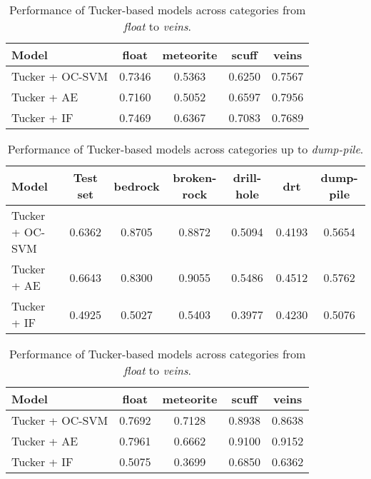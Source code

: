 \documentclass[11pt]{article}
\begin{document}
\begin{table}[h!]
\centering
\begin{tabular}{lcccc}
\hline
\textbf{Model} & \textbf{float} & \textbf{meteorite} & \textbf{scuff} & \textbf{veins} \\
\hline
Tucker + OC-SVM & 0.7346 & 0.5363 & 0.6250 & 0.7567 \\
Tucker + AE     & 0.7160 & 0.5052 & 0.6597 & 0.7956 \\
Tucker + IF     & 0.7469 & 0.6367 & 0.7083 & 0.7689 \\
\hline
\end{tabular}
\caption{Performance of Tucker-based models across categories from \textit{float} to \textit{veins}.}
\label{tab:results_inOrder_tucker_part2}
\end{table}

\begin{table}[h!]
\centering
\begin{tabular}{lcccccc}
\hline
\textbf{Model} & \textbf{Test set} & \textbf{bedrock} & \textbf{broken-rock} & \textbf{drill-hole} & \textbf{drt} & \textbf{dump-pile} \\
\hline
Tucker + OC-SVM & 0.6362 & 0.8705 & 0.8872 & 0.5094 & 0.4193 & 0.5654 \\
Tucker + AE     & 0.6643 & 0.8300 & 0.9055 & 0.5486 & 0.4512 & 0.5762 \\
Tucker + IF     & 0.4925 & 0.5027 & 0.5403 & 0.3977 & 0.4230 & 0.5076 \\
\hline
\end{tabular}
\caption{Performance of Tucker-based models across categories up to \textit{dump-pile}.}
\label{tab:results_random_tucker_part1}
\end{table}

\begin{table}[h!]
\centering
\begin{tabular}{lcccc}
\hline
\textbf{Model} & \textbf{float} & \textbf{meteorite} & \textbf{scuff} & \textbf{veins} \\
\hline
Tucker + OC-SVM & 0.7692 & 0.7128 & 0.8938 & 0.8638 \\
Tucker + AE     & 0.7961 & 0.6662 & 0.9100 & 0.9152 \\
Tucker + IF     & 0.5075 & 0.3699 & 0.6850 & 0.6362 \\
\hline
\end{tabular}
\caption{Performance of Tucker-based models across categories from \textit{float} to \textit{veins}.}
\label{tab:results_random_tucker_part2}
\end{table}
\end{document}
